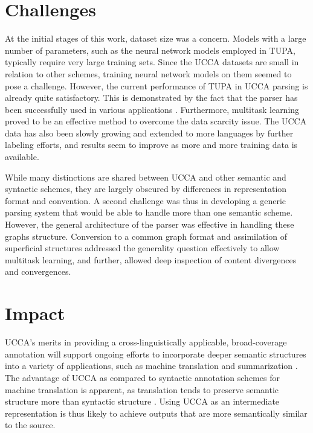 \documentclass[12pt,a4paper]{report}
\begin{document}
\section*{Challenges}

At the initial stages of this work, dataset size was a concern.
Models with a large number of parameters,
such as the neural network models employed in TUPA,
typically require very large training sets.
Since the UCCA datasets are small in relation to other schemes,
training neural network models on them seemed to pose a challenge.
However,
the current performance of TUPA in UCCA parsing is already quite satisfactory.
This is demonstrated by the fact that the parser has been successfully used in
various applications \cite{choshen2018reference,sulem2018semantic,sulem2018simple}.
Furthermore,
multitask learning proved to be an effective method to overcome the data scarcity issue.
The UCCA data has also been slowly growing and extended to more languages by further labeling efforts,
and results seem to improve as more and more training data is available.

While many distinctions are shared between UCCA and other semantic and syntactic schemes,
they are largely obscured by differences in representation format and convention.
A second challenge was thus in developing a generic parsing system that would be able
to handle more than one semantic scheme.
However, the general architecture of the parser was effective in handling these
graphs structure.
Conversion to a common graph format and assimilation of superficial structures
addressed the generality question effectively to allow multitask learning,
and further, allowed deep inspection of content divergences and convergences.

\section*{Impact}

UCCA's merits in providing a cross-linguistically applicable,
broad-coverage annotation will support ongoing efforts to incorporate deeper
semantic structures into a variety of applications, such as machine translation
\citep{jones2012semantics} and summarization \citep{liu2015toward}.
The advantage of UCCA as compared to syntactic annotation schemes for machine translation is apparent,
as translation tends to preserve semantic structure more than syntactic structure \citep{sulem2015conceptual}.
Using UCCA as an intermediate representation is thus likely to achieve outputs that are more
semantically similar to the source.
\end{document}
